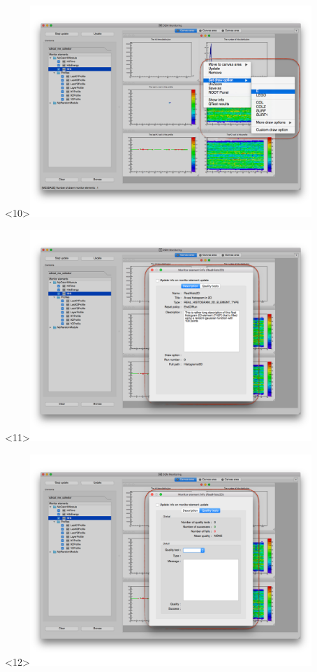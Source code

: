 \documentclass[8pt]{beamer}
\begin{document}
\begin{frame}
\begin{overlayarea}{\textwidth}{\textheight}
\begin{center}
         \begin{onlyenv}<10>\includegraphics[width=0.8\textwidth]{figs/MonitoringGui/MG_HistosMenu}\end{onlyenv}
         \begin{onlyenv}<11>\includegraphics[width=0.8\textwidth]{figs/MonitoringGui/MG_HistoInfo}\end{onlyenv}
         \begin{onlyenv}<12>\includegraphics[width=0.8\textwidth]{figs/MonitoringGui/MG_HistoQuality}\end{onlyenv}

\end{center}
\end{overlayarea}
\end{frame}
\end{document}
